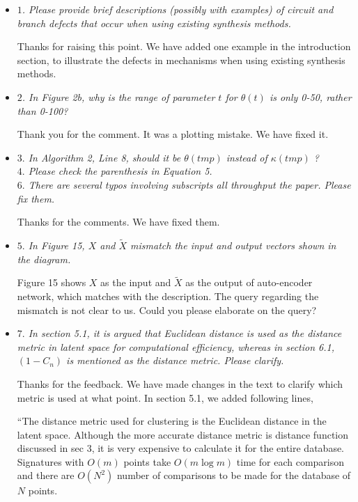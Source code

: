 \documentclass{article}
\begin{document}
\begin{itemize}
  \item \emph{
$1$. Please provide brief descriptions (possibly with examples) of circuit and branch defects that
occur when using existing synthesis methods.
}

Thanks for raising this point.
We have added one example in the introduction section, to illustrate the defects in mechanisms when using existing synthesis methods.
\\

  \item \emph{
  $2$. In Figure 2b, why is the range of parameter $t$ for $\theta(t)$ is only 0-50, rather than 0-100?
}

Thank you for the comment. It was a plotting mistake. We have fixed it.
\\

  \item \emph{
$3.$ In Algorithm 2, Line 8, should it be $\theta(tmp)$ instead of $\kappa(tmp)$ ?\\
$4.$ Please check the parenthesis in Equation 5.\\
$6.$ There are several typos involving subscripts all throughput the paper. Please fix them.
}

Thanks for the comments. We have fixed them.
\\

  \item \emph{
$5.$ In Figure 15, $X$ and $\tilde{X}$ mismatch the input and output vectors shown in the diagram.
}

Figure 15 shows $X$ as the input and $\tilde{X}$ as the output of auto-encoder network, which matches with the description.
The query regarding the mismatch is not clear to us.
Could you please elaborate on the query?
\\


  \item \emph{
$7.$ In section 5.1, it is argued that Euclidean distance is used as the distance metric in latent space for
computational efficiency, whereas in section 6.1, $(1 - C_n)$ is mentioned as the distance
metric. Please clarify.
}

Thanks for the feedback. We have made changes in the text to clarify which metric is used at what point.
In section 5.1, we added following lines,

``The distance metric used for clustering is the Euclidean distance in the latent space.
Although the more accurate distance metric is distance function discussed in sec 3, it is very expensive to calculate it for the entire database.
Signatures with ${O}(m)$ points take ${O}(m\log{}m)$ time for each comparison and there are ${O}(N^2)$ number of comparisons to be made for the database of $N$ points.


\end{itemize}
\end{document}
